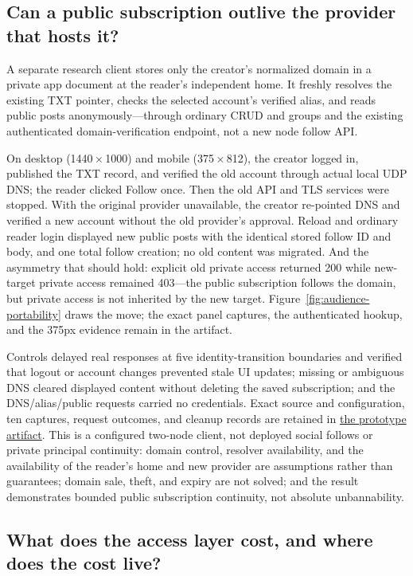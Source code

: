 \documentclass[sigconf, nonacm]{acmart}
\newcommand{\artifactbase}{https://github.com/jacoby149/web10}
\newcommand{\domainartifactrev}{26720acba859c7eb03fc5d26a6221cdde5b764a1}
\newcommand{\domainartifactdir}[2]{\href{\artifactbase/tree/\domainartifactrev/#1}{#2}}
\begin{document}
\subsection{Can a public subscription outlive the provider that hosts it?}
\label{sec:ev-domain}

A separate research client stores only the creator's normalized domain in
a private app document at the reader's independent home. It freshly
resolves the existing TXT pointer, checks the selected account's verified
alias, and reads public posts anonymously---through ordinary CRUD and
groups and the existing authenticated domain-verification endpoint, not a
new node follow API.

On desktop (1440\,$\times$\,1000) and mobile (375\,$\times$\,812), the
creator logged in, published the TXT record, and verified the old account
through actual local UDP DNS; the reader clicked Follow once. Then the
old API and TLS services were stopped. With the original provider
unavailable, the creator re-pointed DNS and verified a new account without
the old provider's approval. Reload and ordinary reader login displayed
new public posts with the identical stored follow ID and body, and one
total follow creation; no old content was migrated. And the asymmetry
that should hold: explicit old private access returned 200 while
new-target private access remained 403---the public subscription follows
the domain, but private access is not inherited by the new target.
Figure~\ref{fig:audience-portability} draws the move; the exact panel
captures, the authenticated hookup, and the 375px evidence remain in the
artifact.

Controls delayed real responses at five identity-transition boundaries
and verified that logout or account changes prevented stale UI updates;
missing or ambiguous DNS cleared displayed content without deleting the
saved subscription; and the DNS/alias/public requests carried no
credentials. Exact source and configuration, ten captures, request
outcomes, and cleanup records are retained in
\domainartifactdir{research/domain-portability-demo}{the
prototype artifact}. This is a configured two-node client, not deployed
social follows or private principal continuity: domain control, resolver
availability, and the availability of the reader's home and new provider
are assumptions rather than guarantees; domain sale, theft, and expiry
are not solved; and the result demonstrates bounded public subscription
continuity, not absolute unbannability.

\subsection{What does the access layer cost, and where does the cost live?}
\label{sec:ev-fanout}
\end{document}
